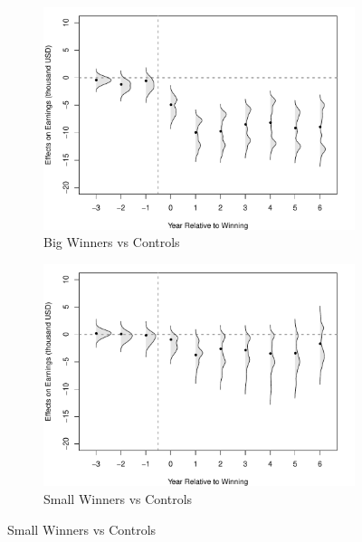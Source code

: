 \documentclass[letterpaper,12pt,leqno]{article}
\begin{document}
\begin{figure}[!ht]
    \caption{CATT Estimates: IRS Data, Trimmed Sample}\label{fig:irs.catt2}
    \centering
    \begin{minipage}[c]{1\textwidth}
        \centering
        \hspace{-2em}\begin{subfigure}{0.45\linewidth}
            \includegraphics[width=\linewidth]{irs1_catt_trim.pdf}
            \caption{Big Winners vs Controls}
        \end{subfigure}
        \begin{subfigure}{0.45\linewidth}
            \includegraphics[width=\linewidth]{irs2_catt_trim.pdf}
            \caption{Small Winners vs Controls}
        \end{subfigure}

\end{minipage}
\end{figure}
\end{document}
